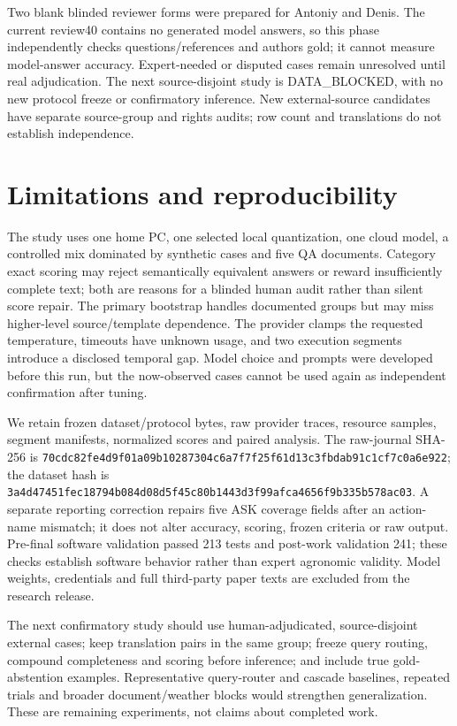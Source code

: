 \documentclass[10pt,a4paper,twocolumn]{article}
\begin{document}
Two blank blinded reviewer forms were prepared for Antoniy and Denis. The current review40 contains no generated model answers, so this phase independently checks questions/references and authors gold; it cannot measure model-answer accuracy. Expert-needed or disputed cases remain unresolved until real adjudication. The next source-disjoint study is DATA\_BLOCKED, with no new protocol freeze or confirmatory inference. New external-source candidates have separate source-group and rights audits; row count and translations do not establish independence.

\section{Limitations and reproducibility}

The study uses one home PC, one selected local quantization, one cloud model, a controlled mix dominated by synthetic cases and five QA documents. Category exact scoring may reject semantically equivalent answers or reward insufficiently complete text; both are reasons for a blinded human audit rather than silent score repair. The primary bootstrap handles documented groups but may miss higher-level source/template dependence. The provider clamps the requested temperature, timeouts have unknown usage, and two execution segments introduce a disclosed temporal gap. Model choice and prompts were developed before this run, but the now-observed cases cannot be used again as independent confirmation after tuning.

We retain frozen dataset/protocol bytes, raw provider traces, resource samples, segment manifests, normalized scores and paired analysis. The raw-journal SHA-256 is {\small\texttt{70cdc82f\allowbreak{}e4d9f01a\allowbreak{}09b10287\allowbreak{}304c6a7f\allowbreak{}7f25f61d\allowbreak{}13c3fbda\allowbreak{}b91c1cf7\allowbreak{}c0a6e922}}; the dataset hash is {\small\texttt{3a4d4745\allowbreak{}1fec1879\allowbreak{}4b084d08\allowbreak{}d5f45c80\allowbreak{}b1443d3f\allowbreak{}99afca46\allowbreak{}56f9b335\allowbreak{}b578ac03}}. A separate reporting correction repairs five ASK coverage fields after an action-name mismatch; it does not alter accuracy, scoring, frozen criteria or raw output. Pre-final software validation passed 213 tests and post-work validation 241; these checks establish software behavior rather than expert agronomic validity. Model weights, credentials and full third-party paper texts are excluded from the research release.

The next confirmatory study should use human-adjudicated, source-disjoint external cases; keep translation pairs in the same group; freeze query routing, compound completeness and scoring before inference; and include true gold-abstention examples. Representative query-router and cascade baselines, repeated trials and broader document/weather blocks would strengthen generalization. These are remaining experiments, not claims about completed work.
\end{document}
